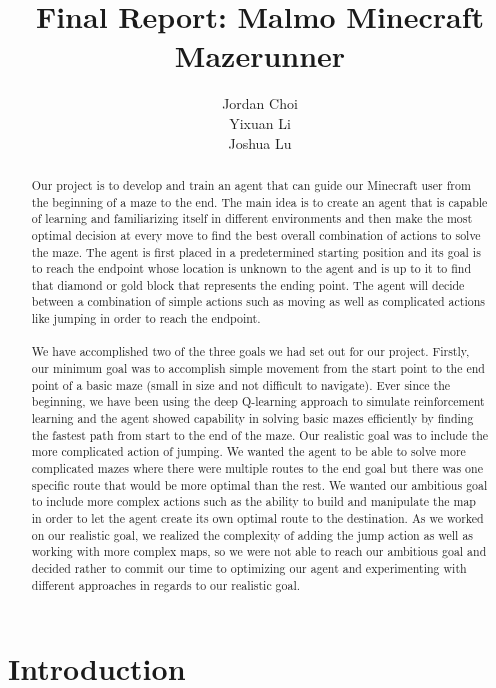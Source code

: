 \documentclass{article}
\title{Final Report: Malmo Minecraft Mazerunner}
\author{%
  Jordan Choi \\
  Yixuan Li \\
  Joshua Lu \\
}
\begin{document}
\maketitle

\begin{abstract}
  Our project is to develop and train an agent that can guide our Minecraft user from the beginning of a maze to the end. The main idea is to create an agent that is capable of learning and familiarizing itself in different environments and then make the most optimal decision at every move to find the best overall combination of actions to solve the maze. The agent is first placed in a predetermined starting position and its goal is to reach the endpoint whose location is unknown to the agent and is up to it to find that diamond or gold block that represents the ending point. The agent will decide between a combination of simple actions such as moving as well as complicated actions like jumping in order to reach the endpoint. 
  \\ \\ We have accomplished two of the three goals we had set out for our project. Firstly, our minimum goal was to accomplish simple movement from the start point to the end point of a basic maze (small in size and not difficult to navigate). Ever since the beginning, we have been using the deep Q-learning approach to simulate reinforcement learning and the agent showed capability in solving basic mazes efficiently by finding the fastest path from start to the end of the maze. Our realistic goal was to include the more complicated action of jumping. We wanted the agent to be able to solve more complicated mazes where there were multiple routes to the end goal but there was one specific route that would be more optimal than the rest. We wanted our ambitious goal to include more complex actions such as the ability to build and manipulate the map in order to let the agent create its own optimal route to the destination. As we worked on our realistic goal, we realized the complexity of adding the jump action as well as working with more complex maps, so we were not able to reach our ambitious goal and decided rather to commit our time to optimizing our agent and experimenting with different approaches in regards to our realistic goal.


\end{abstract}

\section{Introduction}
\end{document}
